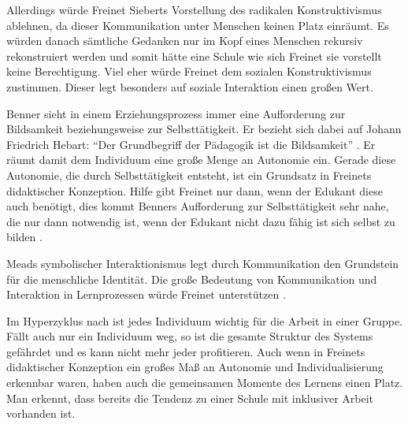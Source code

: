 Allerdings würde Freinet Sieberts Vorstellung des radikalen Konstruktivismus ablehnen, da dieser Kommunikation unter Menschen keinen Platz einräumt.
Es würden danach sämtliche Gedanken nur im Kopf eines Menschen rekursiv rekonstruiert werden \parencite[vgl.][10]{siebert-2003} und somit hätte eine Schule wie sich Freinet sie vorstellt keine Berechtigung.
Viel eher würde Freinet dem sozialen Konstruktivismus zustimmen.
Dieser legt besonders auf soziale Interaktion einen großen Wert.

Benner sieht in einem Erziehungsprozess immer eine Aufforderung zur Bildsamkeit beziehungsweise zur Selbsttätigkeit.
Er bezieht sich dabei auf Johann Friedrich Hebart:
``Der Grundbegriff der Pädagogik ist die Bildsamkeit'' \parencite[70]{benner-2012}.
Er räumt damit dem Individuum eine große Menge an Autonomie ein.
Gerade diese Autonomie, die durch Selbsttätigkeit entsteht, ist ein Grundsatz in Freinets didaktischer Konzeption.
Hilfe gibt Freinet nur dann, wenn der Edukant diese auch benötigt, dies kommt Benners Aufforderung zur Selbsttätigkeit sehr nahe, die nur dann notwendig ist, wenn der Edukant nicht dazu fähig ist sich selbst zu bilden \parencite[vgl.][91]{benner-2012}.

Meads symbolischer Interaktionismus legt durch Kommunikation den Grundstein für die menschliche Identität.
Die große Bedeutung von Kommunikation und Interaktion in Lernprozessen würde Freinet unterstützen \parencite[vgl.][109]{Freinet1979}.

Im Hyperzyklus nach \citeauthor{Zimpel2012} ist jedes Individuum wichtig für die Arbeit in einer Gruppe.
Fällt auch nur ein Individuum weg, so ist die gesamte Struktur des Systems gefährdet und es kann nicht mehr jeder profitieren.
Auch wenn in Freinets didaktischer Konzeption ein großes Maß an Autonomie und Individualisierung erkennbar waren, haben auch die gemeinsamen Momente des Lernens einen Platz.
Man erkennt, dass bereits die Tendenz zu einer Schule mit inklusiver Arbeit vorhanden ist.
